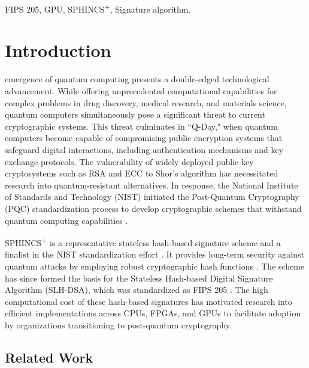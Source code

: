 \documentclass[journal]{IEEEtran}
\begin{document}
\begin{IEEEkeywords}
  FIPS 205, GPU, SPHINCS\textsuperscript{+}, Signature algorithm.
\end{IEEEkeywords}

\section{Introduction}
\label{sec:intro}


 emergence of quantum computing presents a double-edged technological advancement. While offering unprecedented computational capabilities for complex problems in drug discovery, medical research, and materials science, quantum computers simultaneously pose a significant threat to current cryptographic systems. This threat culminates in ``Q-Day," when quantum computers become capable of compromising public encryption systems that safeguard digital interactions, including authentication mechanisms and key exchange protocols. The vulnerability of widely deployed public-key cryptosystems such as RSA and ECC to Shor's algorithm \cite{Shor1994} has necessitated research into quantum-resistant alternatives. In response, the National Institute of Standards and Technology (NIST) initiated the Post-Quantum Cryptography (PQC) standardization process to develop cryptographic schemes that withstand quantum computing capabilities \cite{NIST2016}.

SPHINCS\textsuperscript{+} is a representative stateless hash-based signature scheme and a finalist in the NIST standardization effort \cite{Turan}. It provides long-term security against quantum attacks by employing robust cryptographic hash functions \cite{Bernstein2019}. The scheme has since formed the basis for the Stateless Hash-based Digital Signature Algorithm (SLH-DSA), which was standardized as FIPS 205 \cite{FIPS205}. The high computational cost of these hash-based signatures has motivated research into efficient implementations across CPUs, FPGAs, and GPUs \cite{Joseph2022} to facilitate adoption by organizations transitioning to post-quantum cryptography.

\subsection{Related Work}
\end{document}
